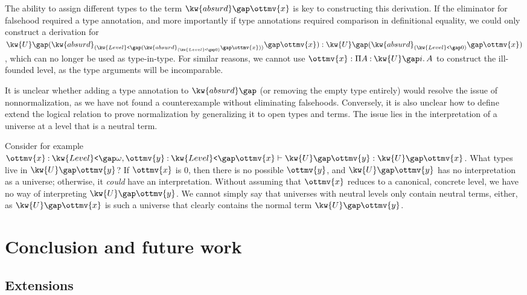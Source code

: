 \documentclass[a4paper,UKenglish,cleveref,autoref,thm-restate]{lipics-v2021}
\newcommand{\citet}[1]{\cite{#1}}
\begin{document}
The ability to assign different types to the term $ \kw{absurd} \gap  \ottmv{x} $ is key to constructing this derivation.
If the eliminator for falsehood required a type annotation,
and more importantly if type annotations required comparison in definitional equality,
we could only construct a derivation for
$ \kw{U} \gap   (  \kw{absurd}_{  (  \kw{Level}\texttt{<} \gap   (  \kw{absurd}_{  (  \kw{Level}\texttt{<} \gap   0   )  } \gap  \ottmv{x}  )   )  } \gap  \ottmv{x}  )   :  \kw{U} \gap   (  \kw{absurd}_{  (  \kw{Level}\texttt{<} \gap   0   )  } \gap  \ottmv{x}  )  $,
which can no longer be used as type-in-type.
For similar reasons, we cannot use $\ottmv{x} :  \Pi  A  \mathbin{:}   \kw{U} \gap  i   \mathpunct{.}  A $
to construct the ill-founded level, as the type arguments will be incomparable.

It is unclear whether adding a type annotation to $ \kw{absurd} \gap   \relax  $
(or removing the empty type entirely) would resolve the issue of nonnormalization,
as we have not found a counterexample without eliminating falsehoods.
Conversely, it is also unclear how to define extend the logical relation to prove normalization
by generalizing it to open types and terms.
The issue lies in the interpretation of a universe at a level that is a neutral term.

Consider for example $   \ottmv{x}  \mathbin{:}   \kw{Level}\texttt{<} \gap   \omega    ,  \ottmv{y}  \mathbin{:}   \kw{Level}\texttt{<} \gap  \ottmv{x}    \vdash   \kw{U} \gap  \ottmv{y}   \mathrel{:}   \kw{U} \gap  \ottmv{x}  $.
What types live in $ \kw{U} \gap  \ottmv{y} $?
If $\ottmv{x}$ is $0$, then there is no possible $\ottmv{y}$,
and $ \kw{U} \gap  \ottmv{y} $ has no interpretation as a universe;
otherwise, it \emph{could} have an interpretation.
Without assuming that $\ottmv{x}$ reduces to a canonical, concrete level,
we have no way of interpreting $ \kw{U} \gap  \ottmv{y} $.
We cannot simply say that universes with neutral levels only contain neutral terms, either,
as $ \kw{U} \gap  \ottmv{x} $ is such a universe that clearly contains the normal term $ \kw{U} \gap  \ottmv{y} $.

\section{Conclusion and future work}

\subsection{Extensions}

\citet{gen-univ,univ-poly}



\end{document}
